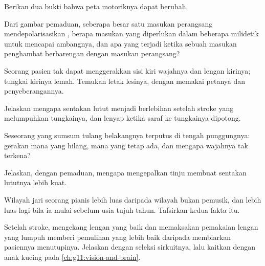 \begin{exercise}[$\star$]\label{exo:g12:brain-and-movement:5}
Berikan dua bukti bahwa peta motoriknya dapat berubah.
\end{exercise}

\begin{exercise}[$\star\star$]\label{exo:g12:brain-and-movement:6}
Dari gambar pemaduan, seberapa besar satu masukan perangsang
mendepolarisasikan , berapa masukan yang diperlukan dalam
beberapa milidetik untuk mencapai ambangnya, dan apa yang terjadi
ketika sebuah masukan penghambat berbarengan dengan masukan perangsang?
\end{exercise}

\begin{exercise}[$\star\star$]\label{exo:g12:brain-and-movement:7}
Seorang pasien tak dapat menggerakkan sisi kiri wajahnya dan lengan
kirinya; tungkai kirinya lemah. Temukan letak lesinya, dengan memakai
petanya dan penyeberangannya.
\end{exercise}

\begin{exercise}[$\star\star$]\label{exo:g12:brain-and-movement:8}
Jelaskan mengapa sentakan lutut menjadi berlebihan setelah stroke yang
melumpuhkan tungkainya, dan lenyap ketika saraf ke tungkainya dipotong.
\end{exercise}

\begin{exercise}[$\star\star$]\label{exo:g12:brain-and-movement:9}
Seseorang yang sumsum tulang belakangnya terputus di tengah
punggungnya: gerakan mana yang hilang,  mana yang tetap ada, dan
mengapa wajahnya tak terkena?
\end{exercise}

\begin{exercise}[$\star\star$]\label{exo:g12:brain-and-movement:10}
Jelaskan, dengan pemaduan, mengapa mengepalkan tinju membuat sentakan
lututnya lebih kuat.
\end{exercise}

\begin{exercise}[$\star\star$]\label{exo:g12:brain-and-movement:11}
Wilayah jari seorang pianis lebih luas daripada wilayah bukan pemusik,
dan lebih luas lagi bila ia mulai sebelum usia tujuh tahun. Tafsirkan
kedua fakta itu.
\end{exercise}

\begin{exercise}[$\star\star\star$]\label{exo:g12:brain-and-movement:12}
Setelah stroke, mengekang lengan yang baik dan memaksakan pemakaian
lengan yang lumpuh memberi pemulihan yang lebih baik daripada
membiarkan pasiennya menutupinya. Jelaskan dengan seleksi sirkuitnya,
lalu kaitkan dengan anak kucing pada \cref{ch:g11:vision-and-brain}.
\end{exercise}

